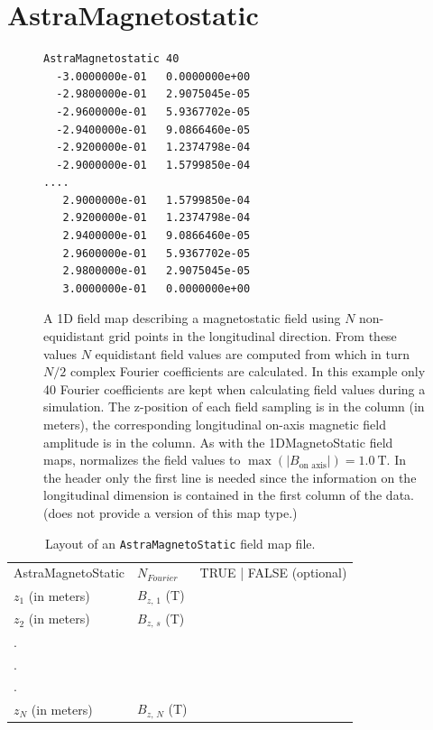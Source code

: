 \section{AstraMagnetostatic}
\label{sec: AstraMagnetostatic}
\begin{figure}[h]
  \begin{fmpage}
\begin{verbatim}
AstraMagnetostatic 40
  -3.0000000e-01   0.0000000e+00
  -2.9800000e-01   2.9075045e-05
  -2.9600000e-01   5.9367702e-05
  -2.9400000e-01   9.0866460e-05
  -2.9200000e-01   1.2374798e-04
  -2.9000000e-01   1.5799850e-04
....
   2.9000000e-01   1.5799850e-04
   2.9200000e-01   1.2374798e-04
   2.9400000e-01   9.0866460e-05
   2.9600000e-01   5.9367702e-05
   2.9800000e-01   2.9075045e-05
   3.0000000e-01   0.0000000e+00
\end{verbatim}
  \end{fmpage}
  \caption[Example of an ASTRA compatible magnetostatic field map]{A 1D field map describing a magnetostatic field using $N$
    non-equidistant grid points in the longitudinal direction. From these values $N$ equidistant field values are computed from
    which in turn $N/2$ complex Fourier coefficients are calculated. In this example only 40 Fourier coefficients are kept
    when calculating field values during a simulation. The z-position of each field sampling is in the 
    column (in meters), the corresponding longitudinal on-axis magnetic field amplitude is in the  column.
    As with the 1DMagnetoStatic  field maps, \opalt normalizes the field values to
    $\max(|B_{\text{on axis}}|) = \SI{1.0}{\tesla}$. In the header only the first line is needed since the information on the
    longitudinal dimension is contained in the first column of the data. (\opalt does not provide a  version of
    this map type.)}
  \label{fig:AstraMagnetoStatic}
\end{figure}

\begin{table}[ht!]
    \caption{Layout of an \texttt{AstraMagnetoStatic} field map file.}
    \label{tab:AstraMagnetoStatic}
    \begin{center}
    \begin{tabular}{lll}
      \hline
      AstraMagnetoStatic & $N_{Fourier}$ & TRUE | FALSE (optional) \\
      $z_{1}$ (in meters) & $B_{z,\,1}$ (T) & \\
      $z_{2}$ (in meters) & $B_{z,\,s}$ (T) & \\
      . & & \\
      . & & \\
      . & & \\
      $z_{N}$ (in meters) & $B_{z,\,N}$ (T) & \\
      \hline
    \end{tabular}
    \end{center}
\end{table}

